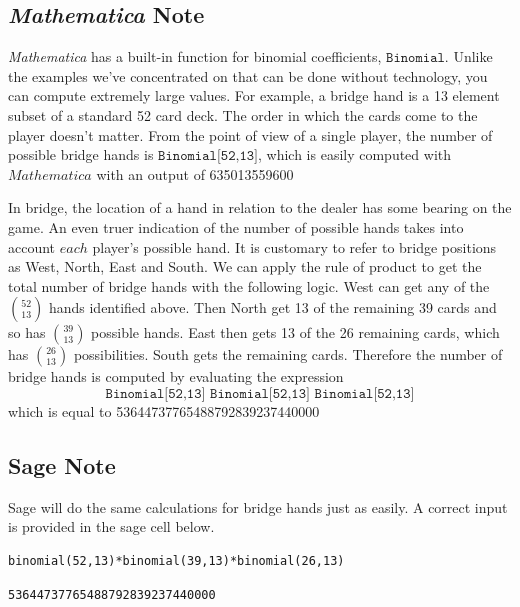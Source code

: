 \documentclass[10pt,]{book}
\theoremstyle{plain}
\theoremstyle{definition}
\theoremstyle{definition}
\theoremstyle{definition}
\begin{document}
\subsection[\emph{Mathematica}  Note]{\emph{Mathematica}  Note}\label{mathematica-binomial}
\emph{Mathematica}  has a built-in function for binomial coefficients, \(\texttt{Binomial}\). Unlike the examples we've concentrated on that can be done without technology, you can compute extremely large values. For 
example, a bridge hand is a 13 element subset of a standard 52 card deck. The order in which the cards come to the player doesn't matter. From the point of view of a single player, the number of possible bridge hands is \(\texttt{Binomial[52,13]}\), which is easily computed with \(Mathematica\) with an output of 635013559600%
\par
In bridge, the location of a hand in relation to the dealer has some bearing on the game. An even truer indication of the number of possible hands takes into account \(each\)  player's possible hand. It is customary 
to refer to bridge positions as West, North, East and South. We can apply the rule of product to get the total number of bridge hands with the following logic. West can get any of the \(\binom{52}{13}\) hands identified above. Then North get 13 of the remaining 39 cards and so has  \(\binom{39}{13}\) possible hands. East then gets 13 of the 26 remaining cards, which has \(\binom{26}{13}\)  possibilities. South gets the remaining cards. Therefore the number of bridge hands is computed by evaluating the expression \begin{equation*}\texttt{Binomial[52,13] Binomial[52,13] Binomial[52,13]}\end{equation*} which is equal to 53644737765488792839237440000%
\typeout{************************************************}
\typeout{************************************************}
\subsection[Sage Note]{Sage Note}\label{sage-bridge-hands}
 Sage will do the same calculations for bridge hands just as easily. A correct input is provided in the sage cell below. 
%
\begin{lstlisting}[style=sageinput]
binomial(52,13)*binomial(39,13)*binomial(26,13)
\end{lstlisting}
\begin{lstlisting}[style=sageoutput]
53644737765488792839237440000
\end{lstlisting}
\typeout{************************************************}
\typeout{************************************************}
\end{document}

